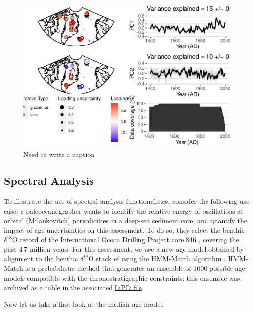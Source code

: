 \documentclass[gc, manuscript]{copernicus}
\begin{document}
\begin{figure}
\centering
\includegraphics{geoChronR-paper_files/figure-latex/unnamed-chunk-7-1.pdf}
\caption{\label{fig:unnamed-chunk-7}Need to write a caption}
\end{figure}

\hypertarget{sec:spec_vignette}{%
\subsection{Spectral Analysis}\label{sec:spec_vignette}}

To illustrate the use of spectral analysis functionalities, consider the following use case: a paleoceanographer wants to identify the relative energy of oscillations at orbital (Milankovitch) periodicities in a deep-sea sediment core, and quantify the impact of age uncertainties on this assessment.
To do so, they select the benthic \(\delta^{18}\mathrm{O}\) record of the International Ocean Drilling Project core 846 \citep[\citet{Shackleton95}]{mix1995benthic}, covering the past 4.7 million years.
For this assessment, we use a new age model obtained by alignment to the benthic \(\delta^{18}\mathrm{O}\) stack of \citet{LisieckiRaymo05} using the HMM-Match algorithm \citep[\citet{Khider_2017}]{ProbStack}.
HMM-Match is a probabilistic method that generates an ensemble of 1000 possible age models compatible with the chronostratigraphic constraints; this ensemble was archived as a table in the associated \href{http://lipdverse.org/geoChronR-examples/ODP846.Lawrence.2006.lpd}{LiPD file}.

Now let us take a first look at the median age model:
\end{document}
